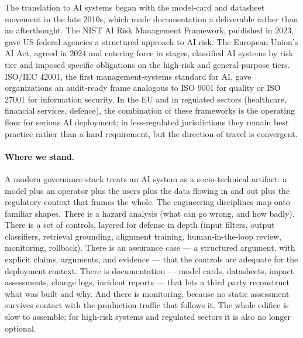 The translation to AI systems began with the model-card and
datasheet movement in the late 2010s, which made documentation a
deliverable rather than an afterthought. The NIST AI Risk
Management Framework, published in 2023, gave US federal agencies a
structured approach to AI risk. The European Union's AI Act, agreed
in 2024 and entering force in stages, classified AI systems by risk
tier and imposed specific obligations on the high-risk and
general-purpose tiers. ISO/IEC 42001, the first management-systems
standard for AI, gave organizations an audit-ready frame analogous
to ISO 9001 for quality or ISO 27001 for information security. In
the EU and in regulated sectors (healthcare, financial services,
defence), the combination of these frameworks is the operating
floor for serious AI deployment; in less-regulated jurisdictions
they remain best practice rather than a hard requirement, but the
direction of travel is convergent.

\paragraph{Where we stand.}
A modern governance stack treats an AI system as a socio-technical
artifact: a model plus an operator plus the users plus the data
flowing in and out plus the regulatory context that frames the
whole. The engineering disciplines map onto familiar shapes. There
is a hazard analysis (what can go wrong, and how badly). There is a
set of controls, layered for defense in depth (input filters,
output classifiers, retrieval grounding, alignment training,
human-in-the-loop review, monitoring, rollback). There is an
assurance case --- a structured argument, with explicit claims,
arguments, and evidence --- that the controls are adequate for the
deployment context. There is documentation --- model cards,
datasheets, impact assessments, change logs, incident reports ---
that lets a third party reconstruct what was built and why. And
there is monitoring, because no static assessment survives contact
with the production traffic that follows it. The whole edifice is
slow to assemble; for high-risk systems and regulated sectors it
is also no longer optional.

